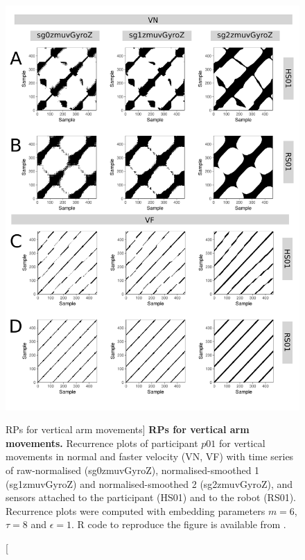 \begin{figure}
\centering
\includegraphics[height=0.80\textheight]{rp_aV}
\caption
	[RPs for vertical arm movements]{
	{\bf RPs for vertical arm movements.}	
	Recurrence plots %
	of participant $p01$ for vertical movements in normal and faster 
	velocity (VN, VF) with time series of raw-normalised (sg0zmuvGyroZ), 
	normalised-smoothed 1 (sg1zmuvGyroZ) and 
	normalised-smoothed 2 (sg2zmuvGyroZ), and 
	sensors attached to the participant (HS01) and to the robot (RS01).
	Recurrence plots were computed with 
	embedding parameters $m=6$, $\tau=8$ and $\epsilon=1$.
	R code to reproduce the figure is available from \cite{hwum2018}.
        }
    \label{fig:rp_aV}
\end{figure}




